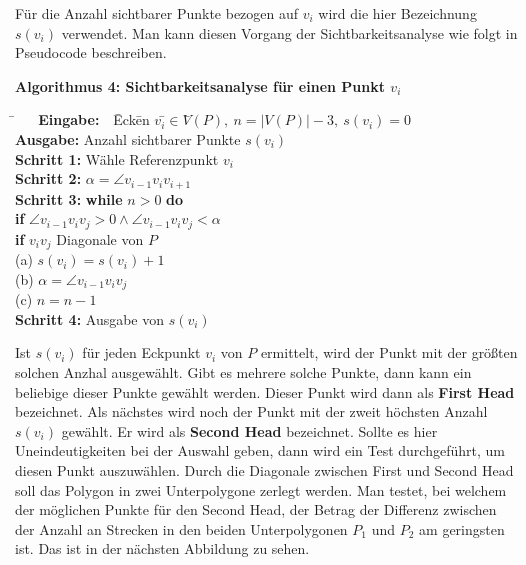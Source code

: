 Für die Anzahl sichtbarer Punkte bezogen auf $v_i$ wird die hier Bezeichnung $s(v_i)$ verwendet. Man kann diesen Vorgang der Sichtbarkeitsanalyse wie folgt in Pseudocode beschreiben.

\begin{flushleft}
    { \textbf{Algorithmus 4: Sichtbarkeitsanalyse für einen Punkt $v_i$}
          \begin{tabbing}
            \=$~~~~~~$ \= \textbf{Eingabe:} $~~~$\=  Eck\=en $v_i$\=$ \in V$\=$(P),~n = |V(P)| - 3,~s(v_i)=0$\\
            \> \> \textbf{Ausgabe:} \> Anzahl sichtbarer Punkte $s(v_i)$\\
            \> \> \textbf{Schritt 1:} \> Wähle Referenzpunkt $v_i$ \\
            \> \> \textbf{Schritt 2:} \>$\alpha = \angle v_{i-1}v_iv_{i+1}$\\
            \> \> \textbf{Schritt 3:} \>\textbf{while} $n > 0$ \textbf{do}\\
            \> \> \> \> \textbf{if} $\angle v_{i-1}v_iv_j > 0 \wedge \angle v_{i-1}v_iv_j < \alpha$\\
            \> \> \> \> \> \textbf{if} $v_iv_j$ Diagonale von $P$\\
            \> \> \> \> \> \> (a) $s(v_i)= s(v_i)+1$\\
            \> \> \> \> \> \> (b) $\alpha = \angle v_{i-1}v_iv_j$\\
            \> \> \> \> \> \> (c) $n = n-1$\\
            \> \> \textbf{Schritt 4:} \> Ausgabe von $s(v_i)$ 

          \end{tabbing}
  }
  \end{flushleft}

Ist $s(v_i)$ für jeden Eckpunkt $v_i$ von $P$ ermittelt, wird der Punkt mit der größten solchen Anzhal ausgewählt. Gibt es mehrere solche Punkte, dann 
kann ein beliebige dieser Punkte gewählt werden. Dieser Punkt wird dann als \textbf{First Head} bezeichnet.
Als nächstes wird noch der Punkt mit der zweit höchsten Anzahl $s(v_i)$ gewählt. Er wird als \textbf{Second Head} bezeichnet. Sollte es hier Uneindeutigkeiten
bei der Auswahl geben, dann wird ein Test durchgeführt, um diesen Punkt auszuwählen. Durch die Diagonale zwischen First und Second Head soll das Polygon in zwei 
Unterpolygone zerlegt werden. Man testet, bei welchem der möglichen Punkte für den Second Head, der Betrag der Differenz zwischen der Anzahl an Strecken in den beiden 
Unterpolygonen $P_1$ und $P_2$ am geringsten ist. Das ist in der nächsten Abbildung zu sehen.

